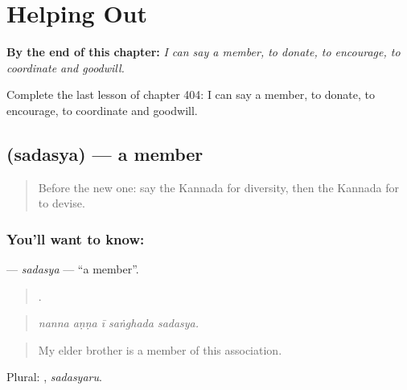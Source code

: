 
\chapter{Helping Out}
\label{ch:ka-helping-out}

\begin{chapteropening}
\textbf{By the end of this chapter:} \emph{I can say a member, to donate, to encourage, to coordinate and goodwill.}

Complete the last lesson of chapter 404: I can say a member, to donate, to encourage, to coordinate and goodwill.
\end{chapteropening}

\section[\texorpdfstring{\kn{ಸದಸ್ಯ} (sadasya)}{ಸದಸ್ಯ (sadasya)}]{ (sadasya) — a member}

\label{lesson:KA-C404-sadasya}



\begin{quote}
Before the new one: say the Kannada for diversity, then the Kannada for to devise.
\end{quote}

\subsection*{You'll want to know: }
\textbf{} — \emph{sadasya} — \textquotedblleft{}a member\textquotedblright{}.

\begin{quote}
    .
\end{quote}

\begin{quote}
\emph{nanna aṇṇa ī saṅghada sadasya.}
\end{quote}

\begin{quote}
My elder brother is a member of this association.
\end{quote}

Plural: , \emph{sadasyaru}.

